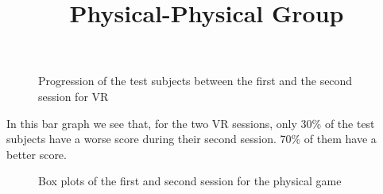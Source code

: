 \documentclass[12pt, openany, twocolumn]{article}
\begin{document}
                \begin{figure}[H]
                    \setlength{\fboxsep}{0pt}
                    \setlength{\fboxrule}{1pt}
                    \caption{Progression of the test subjects between the first and the second session for VR}
                \end{figure}

            In this bar graph we see that, for the two VR sessions, only 30\% of the test subjects have a worse score during their second session. 
            70\% of them have a better score.
            \\

            \noindent \title{\textbf{Physical-Physical Group}}           
                \begin{figure}[H]
                    \setlength{\fboxsep}{0pt}
                    \setlength{\fboxrule}{1pt}
                    \caption{Box plots of the first and second session for the physical game}
                \end{figure}
\end{document}
